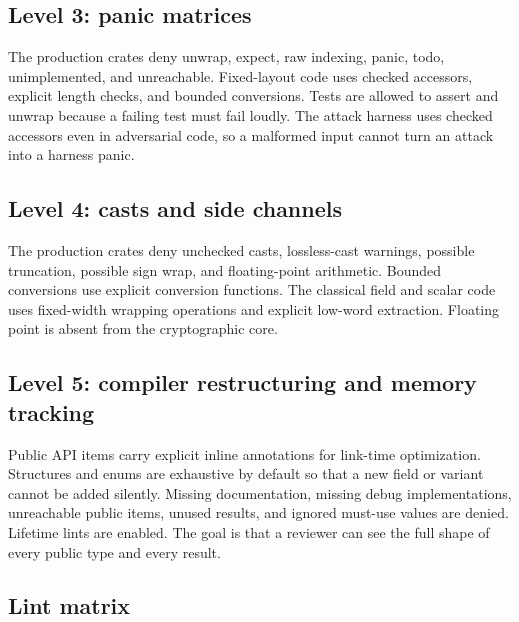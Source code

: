 \documentclass[11pt,a4paper]{article}
\begin{document}
\subsection{Level 3: panic matrices}

The production crates deny unwrap, expect, raw indexing, panic, todo,
unimplemented, and unreachable. Fixed-layout code uses checked accessors,
explicit length checks, and bounded conversions. Tests are allowed to assert
and unwrap because a failing test must fail loudly. The attack harness uses
checked accessors even in adversarial code, so a malformed input cannot turn an
attack into a harness panic.

\subsection{Level 4: casts and side channels}

The production crates deny unchecked casts, lossless-cast warnings, possible
truncation, possible sign wrap, and floating-point arithmetic. Bounded
conversions use explicit conversion functions. The classical field and scalar
code uses fixed-width wrapping operations and explicit low-word extraction.
Floating point is absent from the cryptographic core.

\subsection{Level 5: compiler restructuring and memory tracking}

Public API items carry explicit inline annotations for link-time optimization.
Structures and enums are exhaustive by default so that a new field or variant
cannot be added silently. Missing documentation, missing debug
implementations, unreachable public items, unused results, and ignored
must-use values are denied. Lifetime lints are enabled. The goal is that a
reviewer can see the full shape of every public type and every result.

\subsection{Lint matrix}
\end{document}
